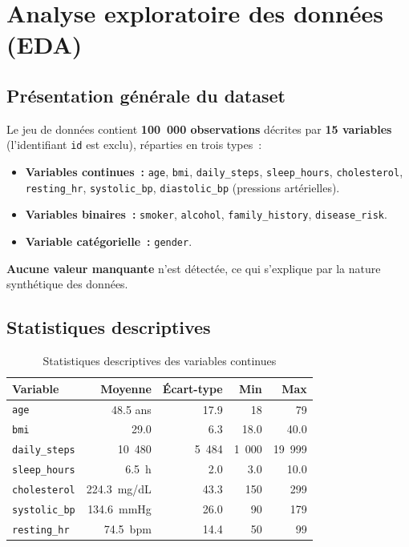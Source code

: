 
\section{Analyse exploratoire des données (EDA)}

\subsection{Présentation générale du dataset}

Le jeu de données contient \textbf{100~000 observations} décrites par \textbf{15 variables} (l'identifiant \texttt{id} est exclu), réparties en trois types~:
\begin{sloppypar}
\begin{itemize}
  \item \textbf{Variables continues~:} \texttt{age}, \texttt{bmi}, \texttt{daily\_steps}, \texttt{sleep\_hours}, \texttt{cholesterol}, \texttt{resting\_hr}, \texttt{systolic\_bp}, \texttt{diastolic\_bp} (pressions artérielles).
  \item \textbf{Variables binaires~:} \texttt{smoker}, \texttt{alcohol}, \texttt{family\_history}, \texttt{disease\_risk}.
  \item \textbf{Variable catégorielle~:} \texttt{gender}.
\end{itemize}
\end{sloppypar}
\textbf{Aucune valeur manquante} n'est détectée, ce qui s'explique par la nature synthétique des données.

\subsection{Statistiques descriptives}

\begin{table}[H]
\centering
\caption{Statistiques descriptives des variables continues}
\label{tab:desc_stats}
\begin{tabular}{lrrrr}
\toprule
Variable & Moyenne & Écart-type & Min & Max \\
\midrule
\texttt{age} & 48.5 ans & 17.9 & 18 & 79 \\
\texttt{bmi} & 29.0 & 6.3 & 18.0 & 40.0 \\
\texttt{daily\_steps} & 10~480 & 5~484 & 1~000 & 19~999 \\
\texttt{sleep\_hours} & 6.5~h & 2.0 & 3.0 & 10.0 \\
\texttt{cholesterol} & 224.3~mg/dL & 43.3 & 150 & 299 \\
\texttt{systolic\_bp} & 134.6~mmHg & 26.0 & 90 & 179 \\
\texttt{resting\_hr} & 74.5~bpm & 14.4 & 50 & 99 \\
\bottomrule
\end{tabular}
\end{table}

